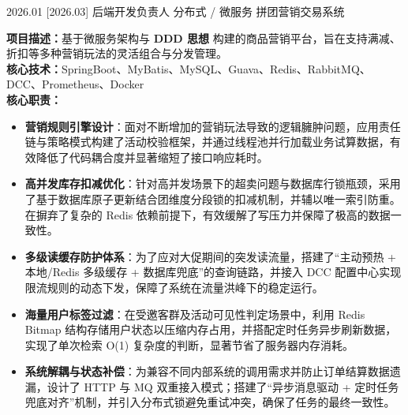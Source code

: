 \documentclass[zh]{resume}
\begin{document}
\begin{projects}
  \project%
    {2026.01}%
    [2026.03]%
    {后端开发负责人}%
    {分布式 / 微服务}%
    {\large 拼团营销交易系统}%
    {\textbf{项目描述：}基于微服务架构与 \textbf{DDD 思想} 构建的商品营销平台，旨在支持满减、折扣等多种营销玩法的灵活组合与分发管理。 \\
    \textbf{核心技术：}SpringBoot、MyBatis、MySQL、Guava、Redis、RabbitMQ、DCC、Prometheus、Docker
    \vspace{0.5ex} \\ \textbf{核心职责：}
    \begin{itemize}
      \item \textbf{营销规则引擎设计}：面对不断增加的营销玩法导致的逻辑臃肿问题，应用责任链与策略模式构建了活动校验框架，并通过线程池并行加载业务试算数据，有效降低了代码耦合度并显著缩短了接口响应耗时。
      \item \textbf{高并发库存扣减优化}：针对高并发场景下的超卖问题与数据库行锁瓶颈，采用了基于数据库原子更新结合团维度分段锁的扣减机制，并辅以唯一索引防重。在摒弃了复杂的 Redis 依赖前提下，有效缓解了写压力并保障了极高的数据一致性。
      \item \textbf{多级读缓存防护体系}：为了应对大促期间的突发读流量，搭建了“主动预热 + 本地/Redis 多级缓存 + 数据库兜底”的查询链路，并接入 DCC 配置中心实现限流规则的动态下发，保障了系统在流量洪峰下的稳定运行。
      \item \textbf{海量用户标签过滤}：在受邀客群及活动可见性判定场景中，利用 Redis Bitmap 结构存储用户状态以压缩内存占用，并搭配定时任务异步刷新数据，实现了单次检索 O(1) 复杂度的判断，显著节省了服务器内存消耗。
      \item \textbf{系统解耦与状态补偿}：为兼容不同内部系统的调用需求并防止订单结算数据遗漏，设计了 HTTP 与 MQ 双重接入模式；搭建了“异步消息驱动 + 定时任务兜底对齐”机制，并引入分布式锁避免重试冲突，确保了任务的最终一致性。
    \end{itemize}}

  \separator{1.0ex}


\end{projects}
\end{document}
